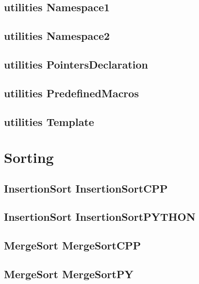 \subsection{utilities Namespace1}
\raggedbottom
\hrulefill
\subsection{utilities Namespace2}
\raggedbottom
\hrulefill
\subsection{utilities PointersDeclaration}
\raggedbottom
\hrulefill
\subsection{utilities PredefinedMacros}
\raggedbottom
\hrulefill
\subsection{utilities Template}
\raggedbottom
\hrulefill

\section{Sorting}
\subsection{InsertionSort InsertionSortCPP}
\raggedbottom
\hrulefill
\subsection{InsertionSort InsertionSortPYTHON}
\raggedbottom
\hrulefill
\subsection{MergeSort MergeSortCPP}
\raggedbottom
\hrulefill
\subsection{MergeSort MergeSortPY}
\raggedbottom
\hrulefill
